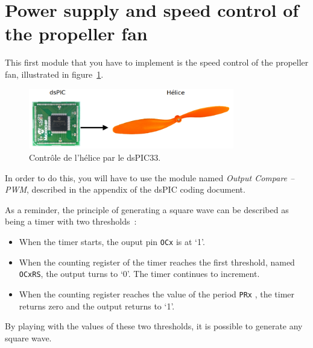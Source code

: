 \documentclass[11pt,a4paper]{article}
\theoremstyle{definition}%
\begin{document}


\section{Power supply and speed control of the propeller fan}
This first module that you have to implement is the speed control of the propeller fan, illustrated in figure~\ref{fig:helice}.

\begin{figure}[H]
\center
\includegraphics[width=0.8\textwidth]{alim-helice}
\caption{Contrôle de l'hélice par le dsPIC33.}
\label{fig:helice}
\end{figure}

In order to do this, you will have to use the module named \textit{Output Compare -- PWM}, described in the appendix of the dsPIC coding document.

As a reminder, the principle of generating a square wave can be described as being a timer with two thresholds~:
\begin{itemize}
	\item When the timer starts, the ouput pin \texttt{OCx} is at ‘1’.
	\item When the counting register of the timer reaches the first threshold, named \texttt{OCxRS}, the output turns to ‘0’.
	The timer continues to increment.
	\item When the counting register reaches the value of the period \texttt{PRx} , the timer returns zero and the output returns to ‘1’.
\end{itemize}

By playing with the values of these two thresholds, it is possible to generate any square wave.
\end{document}
